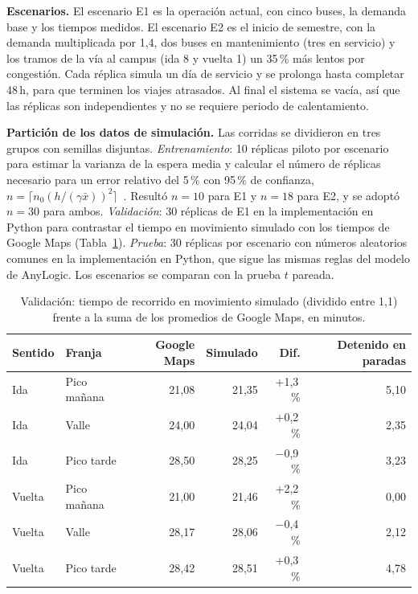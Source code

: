 \documentclass[runningheads]{llncs}
\begin{document}
\textbf{Escenarios.} El escenario E1 es la operación actual, con cinco buses, la demanda base y los tiempos medidos. El escenario E2 es el inicio de semestre, con la demanda multiplicada por 1,4, dos buses en mantenimiento (tres en servicio) y los tramos de la vía al campus (ida 8 y vuelta 1) un 35\,\% más lentos por congestión. Cada réplica simula un día de servicio y se prolonga hasta completar 48\,h, para que terminen los viajes atrasados. Al final el sistema se vacía, así que las réplicas son independientes y no se requiere periodo de calentamiento.

\textbf{Partición de los datos de simulación.} Las corridas se dividieron en tres grupos con semillas disjuntas. \emph{Entrenamiento}: 10 réplicas piloto por escenario para estimar la varianza de la espera media y calcular el número de réplicas necesario para un error relativo del 5\,\% con 95\,\% de confianza, $n = \lceil n_0 (h/(\gamma\bar{x}))^2\rceil$~\cite{law2015}. Resultó $n=10$ para E1 y $n=18$ para E2, y se adoptó $n=30$ para ambos. \emph{Validación}: 30 réplicas de E1 en la implementación en Python para contrastar el tiempo en movimiento simulado con los tiempos de Google Maps (Tabla~\ref{tab:validacion}). \emph{Prueba}: 30 réplicas por escenario con números aleatorios comunes en la implementación en Python, que sigue las mismas reglas del modelo de AnyLogic. Los escenarios se comparan con la prueba $t$ pareada.

\begin{table}[t]
\centering
\caption{Validación: tiempo de recorrido en movimiento simulado (dividido entre 1,1) frente a la suma de los promedios de Google Maps, en minutos.}
\label{tab:validacion}
\setlength{\tabcolsep}{5pt}
\begin{tabular}{llrrrr}
\toprule
Sentido & Franja & Google Maps & Simulado & Dif. & Detenido en paradas\\
\midrule
Ida & Pico mañana & 21,08 & 21,35 & +1,3\,\% & 5,10\\
Ida & Valle & 24,00 & 24,04 & +0,2\,\% & 2,35\\
Ida & Pico tarde & 28,50 & 28,25 & $-$0,9\,\% & 3,23\\
Vuelta & Pico mañana & 21,00 & 21,46 & +2,2\,\% & 0,00\\
Vuelta & Valle & 28,17 & 28,06 & $-$0,4\,\% & 2,12\\
Vuelta & Pico tarde & 28,42 & 28,51 & +0,3\,\% & 4,78\\
\bottomrule
\end{tabular}
\end{table}
\end{document}
